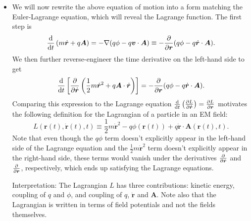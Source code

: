 \documentclass[11pt, a4paper]{article}
\renewcommand{\vec}[1]{\bm{#1}} %
\renewcommand{\r}{\vec{r}}
\newcommand{\A}{\vec{A}} %
\renewcommand{\grad}{\nabla}
\begin{document}
\begin{itemize}
    \item We will now rewrite the above equation of motion into a form matching the Euler-Lagrange equation, which will reveal the Lagrange function. The first step is
    \begin{equation*}
        \dv{t} \left( m \dot{\vec{r}} + q\A \right) = - \grad ( q \phi - q \vec{v}\cdot \A ) \equiv - \pdv{\r} ( q \phi - q \dot{\vec{r}} \cdot \A ).
    \end{equation*}
    We then further reverse-engineer the time derivative on the left-hand side to get
    \begin{equation*}
        \dv{t} \left[ \pdv{ \dot{\vec{r}}} \left( \frac{1}{2} m \dot{\vec{r}}^{2} + q \A \cdot \dot{\vec{r}} \right) \right] = - \pdv{\r} ( q \phi - q \dot{\vec{r}} \cdot \A ).
    \end{equation*}
    Comparing this expression to the Lagrange equation $ \dv{t} \left(\pdv{L}{\dot{\r}} \right) = \pdv{L}{\r} $ motivates the following definition for the Lagrangian of a particle in an EM field:
    \begin{equation*}
        L(\r(t), \dot{\vec{r}}(t), t) \equiv \frac{1}{2}m \dot{\vec{r}}^{2} - q \phi(\r(t)) + q \dot{\vec{r}} \cdot \A(\r(t), t).
    \end{equation*}
    Note that even though the $ q\phi $ term doesn't explicitly appear in the left-hand side of the Lagrange equation and the $ \frac{1}{2}m \dot{\vec{r}}^{2} $ term doesn't explicitly appear in the right-hand side, these terms would vanish under the derivatives $ \pdv{\dot{\vec{r}}} $ and $ \pdv{\r} $, respectively, which ends up satisfying the Lagrange equations.

    Interpretation: The Lagrangian $ L $ has three contributions: kinetic energy, coupling of $ q $ and $ \phi $, and coupling of $ q $, $ \dot{\vec{r}} $ and $ \A $. Note also that the Lagrangian is written in terms of field potentials and not the fields themselves.
    
\end{itemize}
\end{document}

